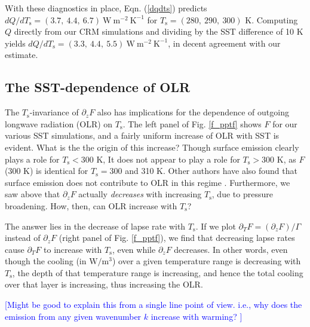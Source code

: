 \documentclass[10pt]{article}
\newcommand{\comment}[1]{\textcolor{blue}{[{#1}]}}
\newcommand{\eqnref}[1]{(\ref{#1})}
\newcommand{\ppz}{\ensuremath{\partial_z}}
\newcommand{\ppt}{\ensuremath{\partial_T}}
\newcommand{\Ts}{\ensuremath{T_\mathrm{s}}}
\newcommand{\Kinverse}{\ensuremath{\mathrm{K^{-1}}}}
\begin{document}
With these diagnostics in place, Eqn. \eqnref{dqdts} predicts $d Q/d \Ts = (3.7,\ 4.4,\  6.7)\ \mathrm{W\ m^{-2}\ \Kinverse}$ for $\Ts= (280,\ 290,\ 300)$ K. Computing $Q$ directly from our CRM simulations and dividing by the SST difference of  10 K yields  $d Q/d \Ts = (3.3,\ 4.4,\  5.5)\ \mathrm{W\ m^{-2}\ \Kinverse}$, in decent agreement with our estimate. 


	\subsection{The SST-dependence of OLR} 
		The \Ts-invariance of $\ppz F$ also has implications for the dependence of outgoing longwave radiation (OLR) on \Ts. The left panel of Fig. \ref{f_pptf} shows $F$ for our various SST simulations, and a fairly uniform increase of OLR with SST is evident. What is the the origin of this increase? Though surface emission clearly plays a role for $\Ts < 300$ K, It does not appear to play a role for $\Ts > 300$ K, as $F$(300 K) is identical for $\Ts=300$ and 310 K. Other authors have also found that surface emission does not contribute to OLR in this regime \citep[e.g.][]{goldblatt2013}. Furthermore, we saw above that $\ppz F$ actually \emph{decreases} with increasing \Ts, due to pressure broadening. How, then, can OLR increase with \Ts? 
		
		The answer lies in the decrease of lapse rate with \Ts. If we plot $\partial_T F = (\ppz F)/\Gamma$ instead of $\ppz F$ (right panel of Fig. \ref{f_pptf}), we find that decreasing lapse rates cause $\ppt F$ to increase with \Ts, even while $\ppz F$ decreases. In other words, even though the cooling (in $\mathrm{W/m^3}$) over a given temperature range is decreasing with \Ts, the depth of that temperature range is increasing, and hence the total cooling over that layer  is increasing, thus increasing the OLR. 
		
		\comment{Might be good to explain this from a single line point of view. i.e., why does the emission from any given wavenumber $k$ increase with warming? } 
	
	

\pagebreak
\end{document}
